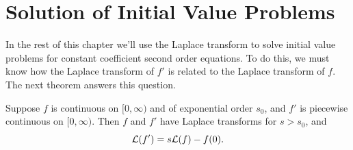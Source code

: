 \section{Solution of Initial Value Problems}

\noindent
{}

\noindent
In the rest of this chapter we'll use the Laplace transform to solve initial value problems for
constant coefficient second order equations. To do this, we must know how the Laplace transform of
$f'$ is related to the Laplace transform of $f$. The next theorem answers this question.

\begin{theorem}
  \color{blue}
  \label{thmtype:8.3.1} Suppose $f$ is continuous on $[0,\infty)$ and of exponential order $s_{0}$,
  and $f'$ is piecewise continuous on $[0,\infty)$. Then $f$ and $f'$ have Laplace transforms for
  $s>s_{0}$, and
  \begin{equation}
    \label{eq:8.3.1}{\cal L}(f')=s{\cal L}(f)-f(0).
  \end{equation}
\end{theorem}

\proof

